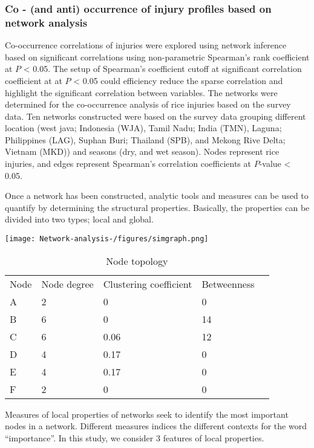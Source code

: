 \subsubsection*{Co - (and anti) occurrence of injury profiles based on network analysis}

Co-occurrence correlations of injuries were explored using network inference based on significant correlations using non-parametric Spearman’s rank coefficient at $P$ < 0.05. The setup of Spearman's coefficient cutoff at significant correlation coefficient at at $P$ < 0.05 could efficiency reduce the sparse correlation and highlight the significant correlation between variables. The networks were determined for the co-occurrence analysis of rice injuries based on the survey data. Ten networks constructed were based on the survey data grouping different location (west java; Indonesia (WJA), Tamil Nadu; India (TMN), Laguna; Philippines (LAG), Suphan Buri; Thailand (SPB), and Mekong Rive Delta; Vietnam (MKD)) and seasons (dry, and wet season). Nodes represent rice injuries, and edges represent Spearman's correlation coefficients at $P$-value < 0.05. 

Once a network has been constructed, analytic tools and measures can be used to quantify by determining the structural properties. Basically, the properties can be divided into two types; local and global. 

\texttt{[image: Network-analysis-/figures/simgraph.png]}

\begin{table}
\centering
\caption{Node topology}
\begin{tabular}{lllll}
Node & Node degree & Clustering coefficient & Betweenness   \\
A    & 2           & 0                      & 0             \\
B    & 6           & 0                      & 14            \\
C    & 6           & 0.06                   & 12            \\
D    & 4           & 0.17                   & 0             \\
E    & 4           & 0.17                   & 0             \\
F    & 2           & 0                      & 0            
\end{tabular}
\end{table}

Measures of local properties of networks seek to identify the most important nodes in a network. Different measures indices the different contexts for the word ``importance''. In this study, we consider 3 features of local properties. 

